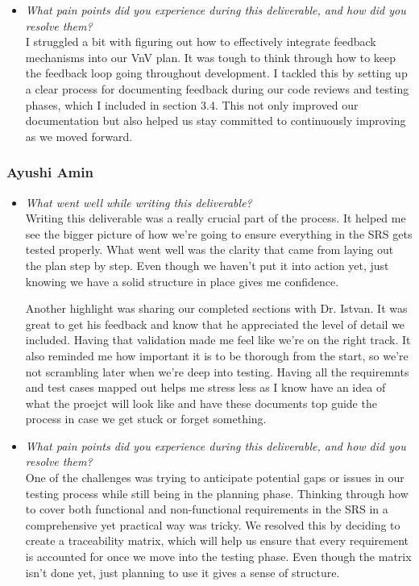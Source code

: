 \documentclass[12pt, titlepage]{article}
\begin{document}
\begin{appendices}
\begin{itemize}
  \item \textit{What pain points did you experience during this deliverable, and how did you resolve them?}\\

  I struggled a bit with figuring out how to effectively integrate feedback mechanisms into our VnV plan. It was tough to think through how to keep the feedback loop going throughout development. I tackled this by setting up a clear process for documenting feedback during our code reviews and testing phases, which I included in section 3.4. This not only improved our documentation but also helped us stay committed to continuously improving as we moved forward.
  
\end{itemize}

\subsubsection*{Ayushi Amin}
\begin{itemize}
  \item \textit{What went well while writing this deliverable?} \\ 

  Writing this deliverable was a really crucial part of the process. It 
  helped me see the bigger picture of how we’re going to ensure everything 
  in the SRS gets tested properly. What went well was the clarity that came 
  from laying out the plan step by step. Even though we haven’t put it into 
  action yet, just knowing we have a solid structure in place gives me confidence.
  
  Another highlight was sharing our completed sections with Dr. Istvan. It 
  was great to get his feedback and know that he appreciated the level of 
  detail we included. Having that validation made me feel like we’re on the 
  right track. It also reminded me how important it is to be thorough from 
  the start, so we’re not scrambling later when we’re deep into testing.
  Having all the requiremnts and test cases mapped out helps me stress less
  as I know have an idea of what the proejct will look like and have these 
  documents top guide the process in case we get stuck or forget something.

  \item \textit{What pain points did you experience during this deliverable, and how did you resolve them?}\\ 
  
  One of the challenges was trying to anticipate potential gaps or issues 
  in our testing process while still being in the planning phase. Thinking 
  through how to cover both functional and non-functional requirements in
  the SRS in a comprehensive yet practical way was tricky. We resolved this
  by deciding to create a traceability matrix, which will help us ensure that 
  every requirement is accounted for once we move into the testing phase. Even 
  though the matrix isn’t done yet, just planning to use it gives a sense 
  of structure. 


\end{itemize}
\end{appendices}
\end{document}
